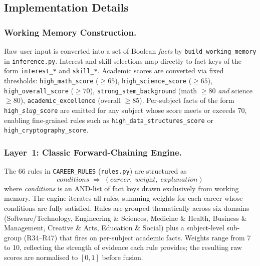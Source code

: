 \documentclass[runningheads]{llncs}
\begin{document}
\subsection{Implementation Details}
\label{sec:impl}

\subsubsection{Working Memory Construction.}
\label{sec:wm}
Raw user input is converted into a set of Boolean \emph{facts} by
\texttt{build\_working\_memory} in \texttt{inference.py}.
Interest and skill selections map directly to fact keys of the form
\texttt{interest\_*} and \texttt{skill\_*}.
Academic scores are converted via fixed thresholds:
\texttt{high\_math\_score} ($\geq 65$),
\texttt{high\_science\_score} ($\geq 65$),
\texttt{high\_overall\_score} ($\geq 70$),
\texttt{strong\_stem\_background} (math $\geq 80$ \emph{and} science $\geq 80$),
\texttt{academic\_excellence} (overall $\geq 85$).
Per-subject facts of the form \texttt{high\_\textit{slug}\_score} are emitted
for any subject whose score meets or exceeds 70, enabling fine-grained rules
such as \texttt{high\_data\_structures\_score} or
\texttt{high\_cryptography\_score}.

\subsubsection{Layer~1: Classic Forward-Chaining Engine.}
\label{sec:classic}
The 66 rules in \texttt{CAREER\_RULES} (\texttt{rules.py}) are structured as
\[
  \textit{conditions} \;\Rightarrow\; (\textit{career},\;\textit{weight},\;\textit{explanation})
\]
where \textit{conditions} is an AND-list of fact keys drawn exclusively from
working memory.  The engine iterates all rules, summing weights for each career
whose conditions are fully satisfied.
Rules are grouped thematically across six domains (Software/Technology,
Engineering \& Sciences, Medicine \& Health, Business \& Management,
Creative \& Arts, Education \& Social) plus a subject-level sub-group (R34--R47)
that fires on per-subject academic facts.
Weights range from 7 to 10, reflecting the strength of evidence each rule
provides; the resulting raw scores are normalised to $[0,1]$ before fusion.
\end{document}
